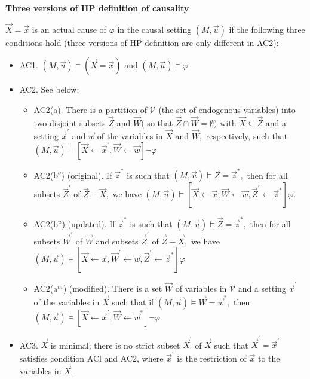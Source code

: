 \documentclass[UTF8]{ctexbook}
\begin{document}
\begin{mdframed}
\textbf{Three versions of HP definition of causality}
	
	$\vec{X}=\vec{x}$ is an actual cause of $\varphi$ in the causal setting $(M, \vec{u})$ if the following three conditions hold (three versions of HP definition are only different in AC2):

	\begin{itemize}
		\item AC1. $(M, \vec{u})\models(\vec{X}=\vec{x})$ and $(M, \vec{u})\models\varphi$
		\item AC2. See below:
		\begin{itemize}
		\item AC2(a). There is a partition of $\mathcal{V}$ (the set of endogenous variables) into two disjoint subsets $\vec{Z}$ and $\vec{W}($ so that $\vec{Z} \cap \vec{W}=\emptyset)$ with $\vec{X} \subseteq \vec{Z}$ and a setting $\vec{x}^{\prime}$ and $\vec{w}$ of the variables in $\vec{X}$ and $\vec{W},$ respectively, such that $(M, \vec{u})\models[\vec{X} \leftarrow \vec{x}^{\prime}, \vec{W} \leftarrow \vec{w}] \neg \varphi$
		\item AC2($\mathrm{b}^{o}$) (original). If $\vec{z}^{*}$ is such that $(M, \vec{u}) \models \vec{Z}=\vec{z}^{*},$ then for all subsets $\vec{Z}^{\prime}$ of $\vec{Z}-\vec{X},$ we have $(M, \vec{u})\models[\vec{X} \leftarrow \vec{x}, \vec{W} \leftarrow \vec{w}, \vec{Z}^{\prime} \leftarrow \vec{z}^{*}] \varphi$.
		\item AC2($\mathrm{b}^{u}$) (updated). If $\vec{z}^{*}$ is such that $(M, \vec{u})\models\vec{Z}=\vec{z}^{*},$ then for all subsets $\vec{W}^{\prime}$ of $\vec{W}$ and subsets $\vec{Z}^{\prime}$ of $\vec{Z}-\vec{X},$ we have $(M, \vec{u})\models[\vec{X} \leftarrow \vec{x}, \vec{W}^{\prime} \leftarrow \vec{w}, \vec{Z}^{\prime} \leftarrow \vec{z}^{*}] \varphi$
		\item AC2($\mathrm{a}^{m}$) (modified). There is a set $\vec{W}$ of variables in $\mathcal{V}$ and a setting $\vec{x}^{\prime}$ of the variables in $\vec{X}$ such that if $(M, \vec{u})\models\vec{W}=\vec{w}^{*},$ then $(M, \vec{u})\models[\vec{X} \leftarrow \vec{x}^{\prime}, \vec{W} \leftarrow \vec{w}^{*}] \neg \varphi$
		\end{itemize}
		\item AC3. $\vec{X}$ is minimal; there is no strict subset $\vec{X}^{\prime}$ of $\vec{X}$ such that $\vec{X}^{\prime}=\vec{x}^{\prime}$ satisfies condition
		ACl and AC2, where $\vec{x}^{\prime}$ is the restriction of $\vec{x}$ to the variables in $\vec{X}$ .
	\end{itemize}
	
\end{mdframed}
\end{document}
